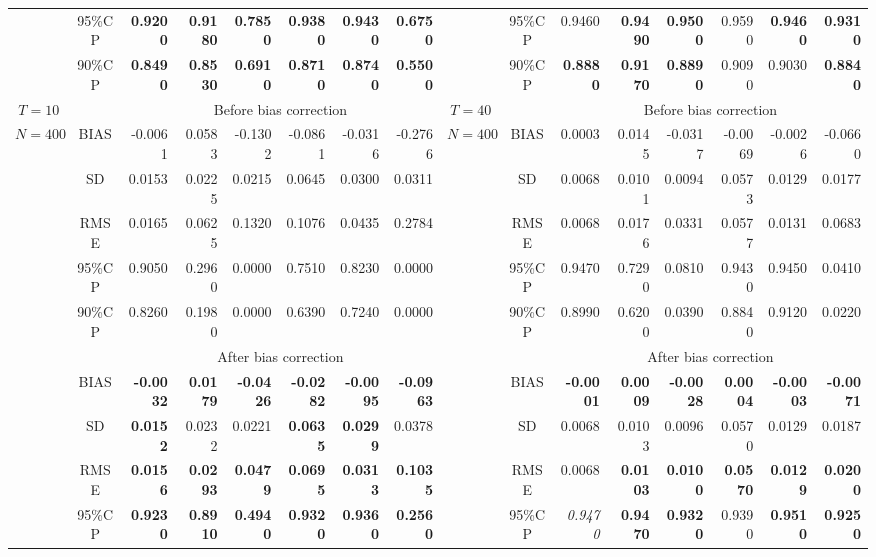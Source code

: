 \documentclass[11pt,a4paper]{article}
\begin{document}
\begin{landscape}
\begin{table}[p]
\begin{threeparttable}
{{\begin{tabular}{ccrrrrrrccrrrrrr}
 & 95\%CP & \textbf{0.9200} & \textbf{0.9180} & \textbf{0.7850} & \textbf{0.9380} & \textbf{0.9430} & \textbf{0.6750} &  & 95\%CP & 0.9460 & \textbf{0.9490} & \textbf{0.9500} & 0.9590 & \textbf{0.9460} & \textbf{0.9310} \\
 & 90\%CP & \textbf{0.8490} & \textbf{0.8530} & \textbf{0.6910} & \textbf{0.8710} & \textbf{0.8740} & \textbf{0.5500} &  & 90\%CP & \textbf{0.8880} & \textbf{0.9170} & \textbf{0.8890} & 0.9090 & 0.9030 & \textbf{0.8840} \\ \hline
$T=10$ &  & \multicolumn{6}{c}{Before bias correction} & $T=40$ &  & \multicolumn{6}{c}{Before bias correction} \\ \cline{3-8} \cline{11-16} 
$N=400$ & BIAS & -0.0061 & 0.0583 & -0.1302 & -0.0861 & -0.0316 & -0.2766 & $N=400$ & BIAS & 0.0003 & 0.0145 & -0.0317 & -0.0069 & -0.0026 & -0.0660 \\
 & SD & 0.0153 & 0.0225 & 0.0215 & 0.0645 & 0.0300 & 0.0311 &  & SD & 0.0068 & 0.0101 & 0.0094 & 0.0573 & 0.0129 & 0.0177 \\
 & RMSE & 0.0165 & 0.0625 & 0.1320 & 0.1076 & 0.0435 & 0.2784 &  & RMSE & 0.0068 & 0.0176 & 0.0331 & 0.0577 & 0.0131 & 0.0683 \\
 & 95\%CP & 0.9050 & 0.2960 & 0.0000 & 0.7510 & 0.8230 & 0.0000 &  & 95\%CP & 0.9470 & 0.7290 & 0.0810 & 0.9430 & 0.9450 & 0.0410 \\
 & 90\%CP & 0.8260 & 0.1980 & 0.0000 & 0.6390 & 0.7240 & 0.0000 &  & 90\%CP & 0.8990 & 0.6200 & 0.0390 & 0.8840 & 0.9120 & 0.0220 \\ \cline{2-8} \cline{10-16} 
 &  & \multicolumn{6}{c}{After bias correction} &  &  & \multicolumn{6}{c}{After bias correction} \\ \cline{3-8} \cline{11-16} 
 & BIAS & \textbf{-0.0032} & \textbf{0.0179} & \textbf{-0.0426} & \textbf{-0.0282} & \textbf{-0.0095} & \textbf{-0.0963} &  & BIAS & \textbf{-0.0001} & \textbf{0.0009} & \textbf{-0.0028} & \textbf{0.0004} & \textbf{-0.0003} & \textbf{-0.0071} \\
 & SD & \textbf{0.0152} & 0.0232 & 0.0221 & \textbf{0.0635} & \textbf{0.0299} & 0.0378 &  & SD & 0.0068 & 0.0103 & 0.0096 & 0.0570 & 0.0129 & 0.0187 \\
 & RMSE & \textbf{0.0156} & \textbf{0.0293} & \textbf{0.0479} & \textbf{0.0695} & \textbf{0.0313} & \textbf{0.1035} &  & RMSE & 0.0068 & \textbf{0.0103} & \textbf{0.0100} & \textbf{0.0570} & \textbf{0.0129} & \textbf{0.0200} \\
 & 95\%CP & \textbf{0.9230} & \textbf{0.8910} & \textbf{0.4940} & \textbf{0.9320} & \textbf{0.9360} & \textbf{0.2560} &  & 95\%CP & \textit{0.9470} & \textbf{0.9470} & \textbf{0.9320} & 0.9390 & \textbf{0.9510} & \textbf{0.9250} \\

\end{tabular}}}
\end{threeparttable}
\end{table}
\end{landscape}
\end{document}
